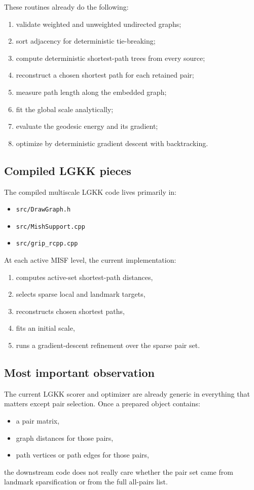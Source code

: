 \documentclass[11pt]{article}
\begin{document}
These routines already do the following:
\begin{enumerate}[leftmargin=1.5em]
\item validate weighted and unweighted undirected graphs;
\item sort adjacency for deterministic tie-breaking;
\item compute deterministic shortest-path trees from every source;
\item reconstruct a chosen shortest path for each retained pair;
\item measure path length along the embedded graph;
\item fit the global scale analytically;
\item evaluate the geodesic energy and its gradient;
\item optimize by deterministic gradient descent with backtracking.
\end{enumerate}

\subsection{Compiled LGKK pieces}

The compiled multiscale LGKK code lives primarily in:
\begin{itemize}[leftmargin=1.5em]
\item \texttt{src/DrawGraph.h}
\item \texttt{src/MishSupport.cpp}
\item \texttt{src/grip\_rcpp.cpp}
\end{itemize}

At each active MISF level, the current implementation:
\begin{enumerate}[leftmargin=1.5em]
\item computes active-set shortest-path distances,
\item selects sparse local and landmark targets,
\item reconstructs chosen shortest paths,
\item fits an initial scale,
\item runs a gradient-descent refinement over the sparse pair set.
\end{enumerate}

\subsection{Most important observation}

The current LGKK scorer and optimizer are already generic in everything that
matters except pair selection. Once a prepared object contains:
\begin{itemize}[leftmargin=1.5em]
\item a pair matrix,
\item graph distances for those pairs,
\item path vertices or path edges for those pairs,
\end{itemize}
the downstream code does not really care whether the pair set came from
landmark sparsification or from the full all-pairs list.
\end{document}
